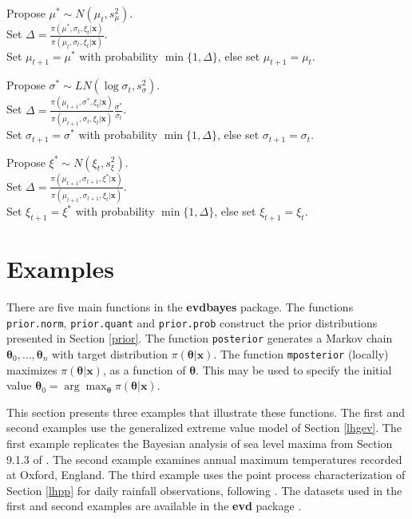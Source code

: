 \documentclass[11pt,a4paper]{article}
\newcommand{\bs}{\boldsymbol}
\begin{document}
\begin{flushleft}
Propose $\mu^* \sim N(\mu_t, s_\mu^2)$.\\
Set $\Delta = \frac{\pi(\mu^*,\sigma_t,\xi_t|\bs{x})}{\pi(\mu_t,\sigma_t,\xi_t|\bs{x})}$.\\
Set $\mu_{t+1} = \mu^*$ with probability $\min\{1, \Delta\}$, else set $\mu_{t+1} = \mu_t$.

Propose $\sigma^* \sim LN(\log \sigma_t, s_\sigma^2)$.\\
Set $\Delta = \frac{\pi(\mu_{t+1},\sigma^*,\xi_t|\bs{x})}{\pi(\mu_{t+1},\sigma_t,\xi_t|\bs{x})} \frac{\sigma^*}{\sigma_t}$.\\
Set $\sigma_{t+1} = \sigma^*$ with probability $\min\{1, \Delta\}$, else set $\sigma_{t+1} = \sigma_t$.

Propose $\xi^* \sim N(\xi_t, s_\xi^2)$.\\
Set $\Delta = \frac{\pi(\mu_{t+1},\sigma_{t+1},\xi^*|\bs{x})}{\pi(\mu_{t+1},\sigma_{t+1},\xi_t|\bs{x})}$.\\
Set $\xi_{t+1} = \xi^*$ with probability $\min\{1, \Delta\}$, else set $\xi_{t+1} = \xi_t$.
\end{flushleft}


\section{Examples}
\setcounter{footnote}{0}
\label{eg} 

There are five main functions in the \textbf{evdbayes} package.
The functions \verb+prior.norm+, \verb+prior.quant+ and \verb+prior.prob+ construct the prior distributions presented in Section \ref{prior}.
The function \verb+posterior+ generates a Markov chain $\bs{\theta}_0,\dots,\bs{\theta}_n$ with target distribution $\pi(\bs{\theta}|\bs{x})$.
The function \verb+mposterior+ (locally) maximizes $\pi(\bs{\theta}|\bs{x})$, as a function of $\bs{\theta}$.
This may be used to specify the initial value $\bs{\theta}_0 = \arg\max_{\bs{\theta}} \pi(\bs{\theta}|\bs{x})$.

This section presents three examples that illustrate these functions. 
The first and second examples use the generalized extreme value model of Section \ref{lhgev}.
The first example replicates the Bayesian analysis of sea level maxima from Section 9.1.3 of \citet{cole01}.
The second example examines annual maximum temperatures recorded at Oxford, England.
The third example uses the point process characterization of Section \ref{lhpp} for daily rainfall observations, following \citet{coletawn94}.
The datasets used in the first and second examples are available in the \textbf{evd} package \citep{step:rn}. 
\end{document}
